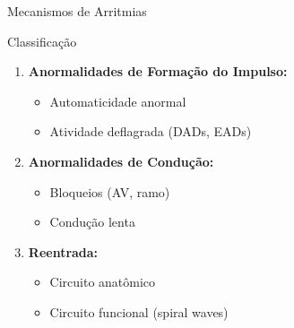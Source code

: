 \begin{frame}{Mecanismos de Arritmias}
\begin{block}{Classificação}
\begin{enumerate}
    \item \textbf{Anormalidades de Formação do Impulso:}
    \begin{itemize}
        \item Automaticidade anormal
        \item Atividade deflagrada (DADs, EADs)
    \end{itemize}

    \item \textbf{Anormalidades de Condução:}
    \begin{itemize}
        \item Bloqueios (AV, ramo)
        \item Condução lenta
    \end{itemize}

    \item \textbf{Reentrada:}
    \begin{itemize}
        \item Circuito anatômico
        \item Circuito funcional (spiral waves)
    \end{itemize}
\end{enumerate}
\end{block}

\vspace{0.3cm}

\end{frame}

